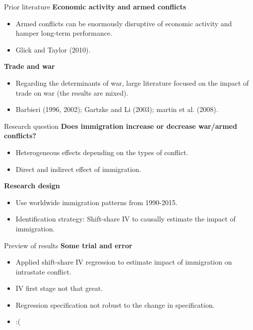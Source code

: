 \documentclass[notes,11pt, aspectratio=169]{beamer}
\begin{document}
\begin{frame}{Prior literature}
	\textbf{Economic activity and armed conflicts}
\begin{itemize}
	\item Armed conflicts can be enormously disruptive of economic activity and hamper long-term performance.
	\item Glick and Taylor (2010).
\end{itemize}\vspace{1em}

\textbf{Trade and war}
\begin{itemize}
	\item Regarding the determinants of war, large literature focused on the impact of trade on war (the results are mixed).
	\item Barbieri (1996, 2002); Gartzke and Li (2003); martin et al. (2008).
\end{itemize}
\end{frame}

\begin{frame}{Research question}
	\textbf{Does immigration increase or decrease war/armed conflicts?}	
	\begin{itemize}
		\item Heterogeneous effects depending on the types of conflict.
		\item Direct and indirect effect of immigration.
	\end{itemize}\vspace{1em}

	\textbf{Research design}
	\begin{itemize}
		\item Use worldwide immigration patterns from 1990-2015.
		\item Identification strategy: Shift-share IV to causally estimate the impact of immigration.
	\end{itemize}
\end{frame}

\begin{frame}{Preview of results}
	\textbf{Some trial and error}
	\begin{itemize}
		\item Applied shift-share IV regression to estimate impact of immigration on intrastate conflict.
		\item IV first stage not that great.
		\item Regression specification not robust to the change in specification.
		\item :(
	\end{itemize}
\end{frame}
\end{document}
